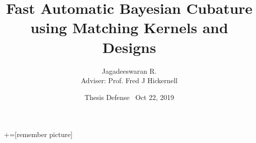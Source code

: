 \documentclass[handout, 10pt,compress,xcolor={usenames,dvipsnames}]{beamer} %
\title[]{Fast Automatic Bayesian Cubature \\ using Matching Kernels and Designs \\[1.0ex] }
\author[]{Jagadeeswaran R. \\
Adviser: Prof. Fred J Hickernell}
\institute{Department of Applied Mathematics,  Illinois Institute of Technology \\
	\href{mailto:jrathin1@iit.edu}{\url{jrathin1@iit.edu}} }
\date[]{Thesis Defense \textbullet\ Oct 22, 2019}
\begin{document}
+=[remember picture]
\everymath{\displaystyle}


\frame{\titlepage}







\iftrue
\begin{frame}{\contentsname}
    \begin{minipage}{\textwidth}
    	\vspace{-6ex}
		\linespread{1.4}
		\begin{multicols}{2}
			\tableofcontents[subsectionstyle=hide] %
		\end{multicols}
    \end{minipage}
	\addtocounter{framenumber}{-1}%
\end{frame}
\fi

\end{document}
